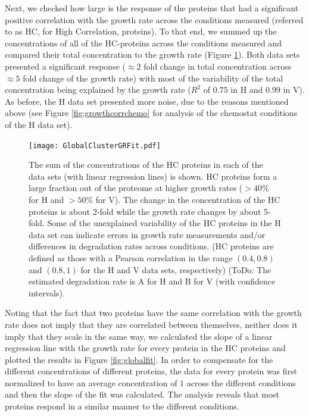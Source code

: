 \documentclass[notitlepage]{article}
\begin{document}
Next, we checked how large is the response of the proteins that had a significant positive correlation with the growth rate across the conditions measured (referred to as HC, for High Correlation, proteins).
To that end, we summed up the concentrations of all of the HC-proteins across the conditions measured and compared their total concentration to the growth rate (Figure \ref{fig:globalgrcorr}).
Both data sets presented a significant response ($\approx 2$ fold change in total concentration across $\approx 5$ fold change of the growth rate) with most of the variability of the total concentration being explained by the growth rate ($R^2$ of $0.75$ in H and $0.99$ in V). 
As before, the H data set presented more noise, due to the reasons mentioned above (see Figure \ref{fig:growthcorrchemo} for analysis of the chemostat conditions of the H data set).

\begin{figure}[h]
\centering
\texttt{[image: GlobalClusterGRFit.pdf]}
\caption{
The sum of the concentrations of the HC proteins in each of the data sets (with linear regression lines) is shown.
HC proteins form a large fraction out of the proteome at higher growth rates ($>40\%$ for H and $>50\%$ for V).
The change in the concentration of the HC proteins is about 2-fold while the growth rate changes by about 5-fold.
Some of the unexplained variability of the HC proteins in the H data set can indicate errors in growth rate measurements and/or differences in degradation rates across conditions.
(HC proteins are defined as those with a Pearson correlation in the range $(0.4,0.8)$ and $(0.8,1)$ for the H and V data sets, respectively)
(ToDo: The estimated degradation rate is A for H and B for V (with confidence intervals).
}
\label{fig:globalgrcorr}
\end{figure}

Noting that the fact that two proteins have the same correlation with the growth rate does not imply that they are correlated between themselves, neither does it imply that they scale in the same way, we calculated the slope of a linear regression line with the growth rate for every protein in the HC proteins and plotted the results in Figure \ref{fig:globalfit}.
In order to compensate for the different concentrations of different proteins, the data for every protein was first normalized to have an average concentration of $1$ across the different conditions and then the slope of the fit was calculated.
The analysis reveals that most proteins respond in a similar manner to the different conditions.
\end{document}

